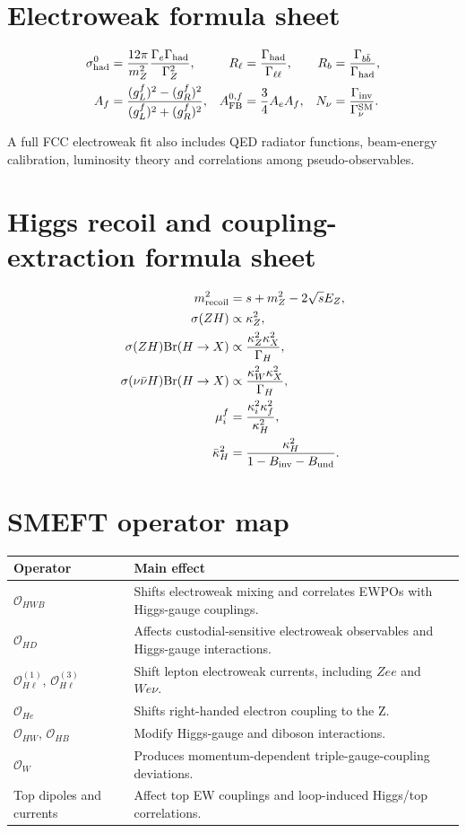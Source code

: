 \documentclass[11pt,a4paper]{report}
\newcommand{\br}{\mathrm{Br}}
\begin{document}
\chapter{Electroweak formula sheet}
\begin{align}
\sigma^0_{\rm had}&=\frac{12\pi}{m_Z^2}\frac{\Gamma_e\Gamma_{\rm had}}{\Gamma_Z^2},&
R_\ell&=\frac{\Gamma_{\rm had}}{\Gamma_{\ell\ell}},&
R_b&=\frac{\Gamma_{b\bar b}}{\Gamma_{\rm had}},\\
A_f&=\frac{(g_L^f)^2-(g_R^f)^2}{(g_L^f)^2+(g_R^f)^2},&
A_{\rm FB}^{0,f}&=\frac{3}{4}A_eA_f,&
N_\nu&=\frac{\Gamma_{\rm inv}}{\Gamma_\nu^{\rm SM}}.
\end{align}

A full FCC electroweak fit also includes QED radiator functions, beam-energy calibration, luminosity theory and correlations among pseudo-observables.

\chapter{Higgs recoil and coupling-extraction formula sheet}
\begin{align}
m_{\rm recoil}^2&=s+m_Z^2-2\sqrt{s}E_Z,\\
\sigma(ZH)&\propto \kappa_Z^2,\\
\sigma(ZH)\br(H\to X)&\propto\frac{\kappa_Z^2\kappa_X^2}{\Gamma_H},\\
\sigma(\nu\bar\nu H)\br(H\to X)&\propto\frac{\kappa_W^2\kappa_X^2}{\Gamma_H},\\
\mu_i^f&=\frac{\kappa_i^2\kappa_f^2}{\kappa_H^2},\\
\bar\kappa_H^2&=\frac{\kappa_H^2}{1-B_{\rm inv}-B_{\rm und}}.
\end{align}

\chapter{SMEFT operator map}
\begin{longtable}{p{}p{}p{}}
\toprule
Operator & Main effect \\
\midrule
$\mathcal O_{HWB}$ & Shifts electroweak mixing and correlates EWPOs with Higgs-gauge couplings.  \\
$\mathcal O_{HD}$ & Affects custodial-sensitive electroweak observables and Higgs-gauge interactions.\\
$\mathcal O_{H\ell}^{(1)}$, $\mathcal O_{H\ell}^{(3)}$ & Shift lepton electroweak currents, including $Zee$ and $We\nu$. \\
$\mathcal O_{He}$ & Shifts right-handed electron coupling to the Z.  \\
$\mathcal O_{HW}$, $\mathcal O_{HB}$ & Modify Higgs-gauge and diboson interactions.  \\
$\mathcal O_W$ & Produces momentum-dependent triple-gauge-coupling deviations.  \\
Top dipoles and currents & Affect top EW couplings and loop-induced Higgs/top correlations.  \\
\bottomrule
\end{longtable}
\end{document}
